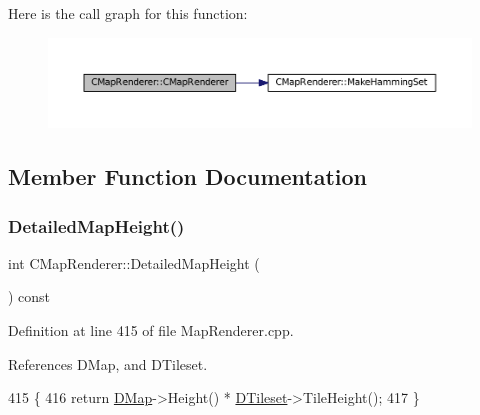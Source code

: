 Here is the call graph for this function\+:\nopagebreak
\begin{figure}[H]
\begin{center}
\leavevmode
\includegraphics[width=350pt]{classCMapRenderer_a9aca3f780976a94fc6e8873e3cf8e199_cgraph}
\end{center}
\end{figure}


\subsection{Member Function Documentation}
\hypertarget{classCMapRenderer_a08177d52d070532e46538ec65c88277d}{}\label{classCMapRenderer_a08177d52d070532e46538ec65c88277d} 
\subsubsection{\texorpdfstring{Detailed\+Map\+Height()}{DetailedMapHeight()}}
{\footnotesize\ttfamily int C\+Map\+Renderer\+::\+Detailed\+Map\+Height (\begin{DoxyParamCaption}{ }\end{DoxyParamCaption}) const}



Definition at line 415 of file Map\+Renderer.\+cpp.



References D\+Map, and D\+Tileset.


\begin{DoxyCode}
415                                          \{
416     \textcolor{keywordflow}{return} \hyperlink{classCMapRenderer_ab9a199c61aa1c87a3248af3085d8ba52}{DMap}->Height() * \hyperlink{classCMapRenderer_ace0648cba050b5e02431096edd15b836}{DTileset}->TileHeight();
417 \}
\end{DoxyCode}
\hypertarget{classCMapRenderer_a12af1a120fdfa3e80f451ba22fe21a62}{}\label{classCMapRenderer_a12af1a120fdfa3e80f451ba22fe21a62} 
